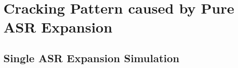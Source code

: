 
\section{Cracking Pattern caused by Pure ASR Expansion}

\subsection{Single ASR Expansion Simulation}


